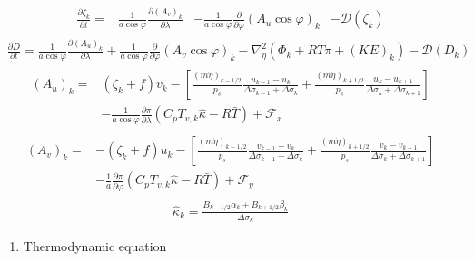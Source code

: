 \begin{eqnarray}
\begin{aligned}
  \frac{\partial \zeta_k}{\partial t}
        = & \frac{1}{a\cos\varphi}
            \frac{\partial (A_v)_k}{\partial \lambda}
          & - \frac{1}{a\cos\varphi}
            \frac{\partial }{\partial \varphi} (A_u \cos\varphi)_k
          & - {\mathcal D}(\zeta_k)
 \end{aligned}
\end{eqnarray} \begin{eqnarray}
  \frac{\partial D}{\partial t}
        =  \frac{1}{a\cos\varphi}
            \frac{\partial (A_u)_k}{\partial \lambda}
          + \frac{1}{a\cos\varphi}
            \frac{\partial }{\partial \varphi} (A_v \cos\varphi)_k
          - \nabla^{2}_{\eta}
           ( \Phi_k + R\bar{T} \pi
             + ({\mathit KE})_k )
          - {\mathcal D}(D_k)
\end{eqnarray} \begin{eqnarray}
\begin{aligned}
  (A_u)_k
    = & ( \zeta_k + f ) v_k
             - \left[ \frac{(m\dot{\eta})_{k-1/2}}{p_s} \frac{u_{k-1} - u_k}{\Delta\sigma_{k-1}+\Delta\sigma_k}
               + \frac{(m\dot{\eta})_{k+1/2}}{p_s} \frac{u_k   - u_{k+1}}{\Delta\sigma_{k}+\Delta\sigma_{k+1}} \right] \\
           & -  \frac{1}{a\cos\varphi} \frac{\partial \pi}{\partial \lambda}(C_p T_{v,k}\hat{\kappa}-R\bar{T})
             + {\mathcal F}_x
\end{aligned}
\end{eqnarray} \begin{eqnarray}
\begin{aligned}
  (A_v)_k
    = & - ( \zeta_k + f ) u_k
             - \left[ \frac{(m\dot{\eta})_{k-1/2}}{p_s} \frac{v_{k-1} - v_k}{\Delta\sigma_{k-1}+\Delta\sigma_k}
               + \frac{(m\dot{\eta})_{k+1/2}}{p_s} \frac{v_k   - v_{k+1}}{\Delta\sigma_{k}+\Delta\sigma_{k+1}} \right] \\
           &- \frac{1}{a} \frac{\partial \pi}{\partial \varphi}(C_p T_{v,k}\hat{\kappa}-R\bar{T})
             + {\mathcal F}_y
\end{aligned}
\end{eqnarray} \begin{eqnarray}
   \hat{\kappa}_k
    =\frac{ B_{k-1/2} \alpha_k + B_{k+1/2} \beta_k }
            { \Delta\sigma_k                                  } \end{eqnarray}

\begin{enumerate}
\def\labelenumi{\arabic{enumi}.}
\setcounter{enumi}{3}
\tightlist
\item
  Thermodynamic equation
\end{enumerate}

